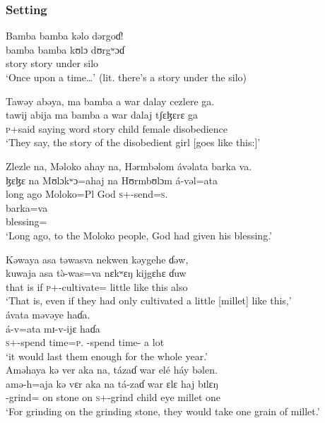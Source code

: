 \subsubsection*{Setting}
\ea Bamba  bamba  kəlo  dərgoɗ!\\
\gll bamba   bamba   kʊlɔ     dʊrgʷɔɗ\\
story        story     under    silo\\
\glt ‘Once upon a time…’ (lit. there’s a story under the silo)
\z

\ea    Tawəy  abəya,  ma  bamba  a  war  dalay  cezlere  ga.\\
\gll tawij  abija    ma   bamba   a       war     dalaj      tʃɛɮɛrɛ        ga\\
\textsc{p}+said  saying   word   story   {\GEN}   child   female  disobedience   {\ADJ}\\
\glt ‘They say, the story of the disobedient girl [goes like this:]’\\
\z

\ea    Zlezle  na,  Məloko  ahay  na,  Hərmbəlom  ávəlata  barka  va.\\
\gll ɮɛɮɛ        na  Mʊlɔkʷɔ=ahaj     na  Hʊrmbʊlɔm  á-vəl=ata     \\   
{long ago}         {\PSP}  Moloko=Pl          {\PSP}  God       \textsc{s}+{\IFV}-send=\textsc{s}.{\IO}  \\ 

\medskip
 \gll barka=va\\
 blessing={\PRF}\\
 \glt ‘Long ago, to the Moloko people, God had given his blessing.’\\
\z

\clearpage
\ea Kəwaya  asa  təwasva  nekwen  kəygehe  ɗəw,\\
\gll kuwaja   asa    t\`ə-was=va  nɛkʷɛŋ    kijgɛhɛ     ɗuw\\
{that is}   if     \textsc{p}+{\PFV}-cultivate={\PRF}  little       {like this}    also\\
\glt ‘That is, even if they had only cultivated a little [millet] like this,’\\

\medskip
 ávata  məvəye  haɗa.  \\
\gll á-v=ata  mɪ-v-ijɛ         haɗa\\
\textsc{s}+{\IFV}-{spend time}=\textsc{p}.{\IO}   {\NOM}-{spend time}-{\CL}  {a lot}\\
\glt ‘it would last them enough for the whole year.’  \\
\z
\ea    Aməhaya  kə  ver  aka  na,  tázaɗ  war  elé  háy  bəlen.\\
\gll amə-h=aja   kə   vɛr   aka  na  tá-zaɗ       war   ɛlɛ  haj  bɪlɛŋ\\
{\DEP}-grind={\PLU}  on   stone   on    {\PSP}  \textsc{s}+{\IFV}-grind  child   eye   millet    one\\
\glt ‘For grinding on the grinding stone, they would take one grain of millet.’\\
\z

